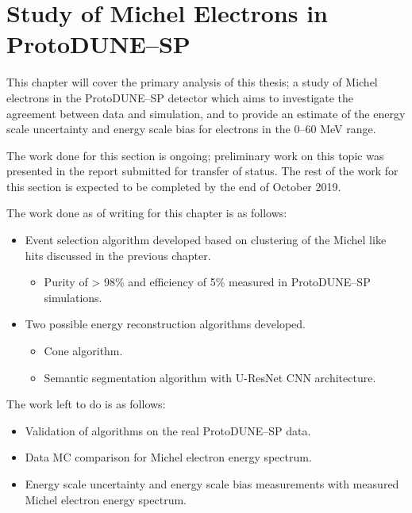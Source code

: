 \chapter{\label{ch:6-michel}Study of Michel Electrons in ProtoDUNE--SP} 


This chapter will cover the primary analysis of this thesis; a study of Michel
electrons in the ProtoDUNE--SP detector which aims to investigate the agreement
between data and simulation, and to provide an estimate of the energy scale
uncertainty and energy scale bias for electrons in the 0--60 MeV range. 

The work done for this section is ongoing; preliminary work on this topic was
presented in the report submitted for transfer of status. The rest of the work
for this section is expected to be completed by the end of October 2019.

\noindent The work done as of writing for this chapter is as follows:
\begin{itemize}[noitemsep,nolistsep]
	\item Event selection algorithm developed based on clustering of the Michel
	like hits discussed in the previous chapter.
	\begin{itemize}[noitemsep,nolistsep]
		\item Purity of > 98\% and efficiency of 5\% measured in ProtoDUNE--SP 
		simulations.
	\end{itemize}
	\item Two possible energy reconstruction algorithms developed.
	\begin{itemize}[noitemsep,nolistsep]
		\item Cone algorithm.
		\item Semantic segmentation algorithm with U-ResNet CNN architecture.
	\end{itemize}
\end{itemize}

\noindent The work left to do is as follows:
\begin{itemize}[noitemsep, nolistsep]
	\item Validation of algorithms on the real ProtoDUNE--SP data.
	\item Data MC comparison for Michel electron energy spectrum.
	\item Energy scale uncertainty and energy scale bias measurements with 
	measured Michel electron energy spectrum.
\end{itemize}

